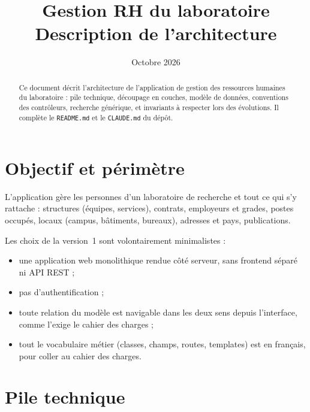 \documentclass[a4paper,11pt]{article}
\title{\textbf{Gestion RH du laboratoire}\\[0.3em]\large Description de l'architecture}
\author{}
\date{Octobre 2026}
\newcommand{\code}[1]{\texttt{#1}}
\begin{document}
\maketitle

\begin{abstract}
Ce document décrit l'architecture de l'application de gestion des ressources
humaines du laboratoire : pile technique, découpage en couches, modèle de
données, conventions des contrôleurs, recherche générique, et invariants à
respecter lors des évolutions. Il complète le \code{README.md} et le
\code{CLAUDE.md} du dépôt.
\end{abstract}

\tableofcontents

\section{Objectif et périmètre}

L'application gère les personnes d'un laboratoire de recherche et tout ce qui
s'y rattache : structures (équipes, services), contrats, employeurs et grades,
postes occupés, locaux (campus, bâtiments, bureaux), adresses et pays,
publications.

Les choix de la version~1 sont volontairement minimalistes :
\begin{itemize}
  \item une application web monolithique rendue côté serveur, sans frontend
        séparé ni API REST ;
  \item pas d'authentification ;
  \item toute relation du modèle est navigable dans les deux sens depuis
        l'interface, comme l'exige le cahier des charges ;
  \item tout le vocabulaire métier (classes, champs, routes, templates) est en
        français, pour coller au cahier des charges.
\end{itemize}

\section{Pile technique}
\end{document}
